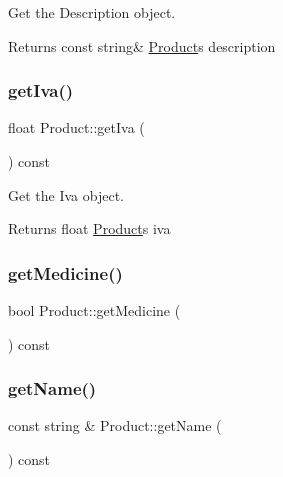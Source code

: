 Get the Description object. 

\begin{DoxyReturn}{Returns}
const string\& \hyperlink{classProduct}{Product}\textquotesingle{}s description 
\end{DoxyReturn}
\mbox{\label{classProduct_a50605c5d457a7400a8dd5a0848480297}} 
\subsubsection{\texorpdfstring{get\+Iva()}{getIva()}}
{\footnotesize\ttfamily float Product\+::get\+Iva (\begin{DoxyParamCaption}{ }\end{DoxyParamCaption}) const}



Get the Iva object. 

\begin{DoxyReturn}{Returns}
float \hyperlink{classProduct}{Product}\textquotesingle{}s iva 
\end{DoxyReturn}
\mbox{\label{classProduct_a3a703454d7777191ad9282b38bce15e1}} 
\subsubsection{\texorpdfstring{get\+Medicine()}{getMedicine()}}
{\footnotesize\ttfamily bool Product\+::get\+Medicine (\begin{DoxyParamCaption}{ }\end{DoxyParamCaption}) const}

\mbox{\label{classProduct_acbf3d46720bb1a0d16e49663b73b803d}} 
\subsubsection{\texorpdfstring{get\+Name()}{getName()}}
{\footnotesize\ttfamily const string \& Product\+::get\+Name (\begin{DoxyParamCaption}{ }\end{DoxyParamCaption}) const}



